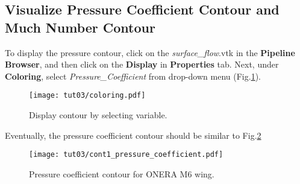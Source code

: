 \subsection{Visualize Pressure Coefficient Contour and Much Number Contour}
To display the pressure contour, click on the \textit{surface\_flow}.vtk in the \textbf{Pipeline Browser}, and then click on the \textbf{Display} in \textbf{Properties} tab. Next, under \textbf{Coloring}, select \textit{Pressure\_Coefficient} from drop-down menu (Fig.\ref{fig:pressure_coeff_1}).
\begin{figure}[htbp]
    \centering
    \texttt{[image: tut03/coloring.pdf]}
    \caption{Display contour by selecting variable.}
    \label{fig:pressure_coeff_1}
\end{figure}
Eventually, the pressure coefficient contour should be similar to Fig.\ref{fig:plot_pressure_coeff}
\begin{figure}[htbp]
    \centering
    \texttt{[image: tut03/cont1\_pressure\_coefficient.pdf]}
    \caption{Pressure coefficient contour for ONERA M6 wing.}
    \label{fig:plot_pressure_coeff}
\end{figure}

